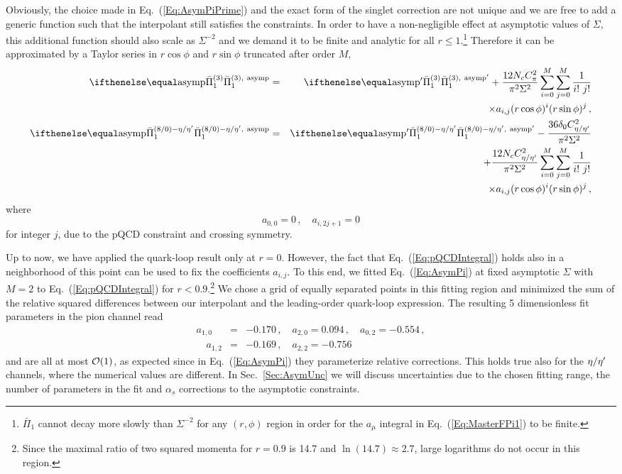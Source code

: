 Obviously, the choice made in Eq.~(\ref{Eq:AsymPiPrime}) and the exact form of the singlet correction are not unique and we are free to add a generic function such that the interpolant still satisfies the constraints. In order to have a non-negligible effect at asymptotic values of $\Sigma$, this additional function should also scale as $\Sigma^{-2}$ and we demand it to be finite and analytic for all $r\le 1$.\footnote{$\bar{\Pi}_1$ cannot decay more slowly than $\Sigma^{-2}$ for any $(r,\phi)$ region in order for the $a_\mu$ integral in Eq.~(\ref{Eq:MasterFPi1}) to be finite.} Therefore it can be approximated by a Taylor series in $r\cos\phi$ and $r \sin\phi$ truncated after order $M$,
\begin{eqnarray}
\Pipion[\text{asymp}] & = & \Pipion[\text{asymp}'] +\frac{12 N_c C_\pi^2}{\pi^2 \Sigma^2} \sum_{i=0}^{M} \sum_{j=0}^{M} \frac{1}{i!\ j!} \nonumber\\
&&\times a_{i,j} (r\cos\phi)^i (r\sin\phi)^j\,, \nonumber \\
\Pietaetap[\text{asymp}] & = & \Pietaetap[\text{asymp}'] - \frac{36 \delta_0 C_\etaetap^2}{\pi^2 \Sigma^2} \nonumber \\
&& + \frac{12 N_c C_\etaetap^2}{\pi^2 \Sigma^2} \sum_{i=0}^{M} \sum_{j=0}^{M} \frac{1}{i!\ j!} \nonumber \\
&&\times a_{i,j} (r\cos\phi)^i (r\sin\phi)^j\, ,
\label{Eq:AsymPi}
\end{eqnarray}
where
\begin{equation}
a_{0,0} = 0\,, \quad a_{i,2j+1} = 0
\label{Eq:Conaij}
\end{equation}
for integer $j$, due to the pQCD constraint and crossing symmetry. 

Up to now, we have applied the quark-loop result only at $r = 0$. However, the fact that Eq.~(\ref{Eq:pQCDIntegral}) holds also in a neighborhood of this point can be used to fix the coefficients $a_{i,j}$. To this end, we fitted Eq.~(\ref{Eq:AsymPi}) at fixed asymptotic $\Sigma$ with $M = 2$ to Eq.~(\ref{Eq:pQCDIntegral}) for $r<0.9$.\footnote{Since the maximal ratio of two squared momenta for $r=0.9$ is \num{14.7} and $\ln(14.7) \approx 2.7$, large logarithms do not occur in this region.} We chose a grid of equally separated points in this fitting region and minimized the sum of the relative squared differences between our interpolant and the leading-order quark-loop expression. The resulting 5 dimensionless fit parameters in the pion channel read
\begin{eqnarray}
a_{1,0} & = & \num{-0.170} \,,\quad a_{2,0} = \num{0.094} \,,\quad a_{0,2} = \num{-0.554}\,,\nonumber\\
\quad a_{1,2} & = & \num{-0.169} \,,\quad a_{2,2} = \num{-0.756}
\label{Eq:AsymPi_a_pion}
\end{eqnarray}
and are all at most $\mathcal{O}(1)$, as expected since in Eq.~(\ref{Eq:AsymPi}) they parameterize relative corrections. This holds true also for the ${\eta / \eta'}$ channels, where the numerical values are different. In Sec.~\ref{Sec:AsymUnc} we will discuss uncertainties due to the chosen fitting range, the number of parameters in the fit and $\alpha_s$ corrections to the asymptotic constraints.